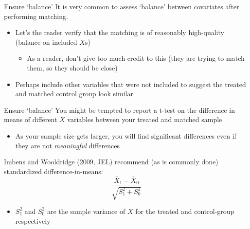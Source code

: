 \documentclass[aspectratio=169,t,11pt,table]{beamer}
\begin{document}
\begin{frame}{Ensure `balance'}
  It is very common to assess `balance' between covariates after performing matching. 
  \begin{itemize}
    \item Let's the reader verify that the matching is of reasonably high-quality (balance on included $X$s)
    \begin{itemize}
      \item As a reader, don't give too much credit to this (they are trying to match them, so they should be close)
    \end{itemize}
    
    \item Perhaps include other variables that were not included to suggest the treated and matched control group look similar
  \end{itemize}
\end{frame}

\begin{frame}{Ensure `balance'}
  You might be tempted to report a t-test on the difference in means of different $X$ variables between your treated and matched sample
  \begin{itemize}
    \item As your sample size gets larger, you will find significant differences even if they are not \emph{meaningful} differences
  \end{itemize}
  
  \bigskip
  Imbens and Wooldridge (2009, JEL) recommend (as is commonly done) standardized difference-in-means:
  $$
    \frac{\bar{X}_1 - \bar{X}_0}{\sqrt{S_1^2 + S_0^2}}
  $$
  \begin{itemize}
    \item $S_1^2$ and $S_0^2$ are the sample variance of $X$ for the treated and control-group respectively 
  \end{itemize}
\end{frame}
\end{document}
